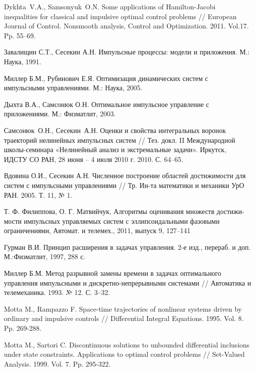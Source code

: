 \pagebreak
\begin{thebibliography}{99}

 { Dykhta~V.A., Samsonyuk~O.N.}  Some applications of
  Hamilton-Jacobi inequalities for classical and impulsive optimal
  control problems // European Journal of Control. Nonsmooth analysis,
  Control and Optimization. 2011. Vol.17. Pp. 55--69.

 { Завалищин С.Т., Сесекин А.Н.}  {Импульсные
    процессы: модели и приложения}.  М.: Наука, 1991.

 { Миллер Б.М., Рубинович Е.Я.}  { Оптимизация
    динамических систем с импульсными управлениями}.  М.: Наука, 2005.

 { Дыхта В.А., Самсонюк О.Н.}  Оптимальное импульсное
  управление с приложениями.  М.: Физматлит, 2003.

 { Самсонюк~О.Н., Сесекин~А.Н.} Оценки и свойства
  интегральных воронок траекторий нелинейных импульсных систем //
  Тез. докл. II Международной школы-семинара «Нелинейный анализ и
  экстремальные задачи». Иркутск, ИДСТУ СО РАН, 28 июня -- 4 июля 2010
  г. 2010. С. 64--65.

 Вдовина О.И., Сесекин А.Н. Численное построение
  областей достижимости для систем с импульсными управлениями //
  Тр. Ин-та математики и механики УрО РАН.  2005. Т. 11, № 1.

 Т. Ф. Филиппова, О. Г. Матвийчук, Алгоритмы
  оценивания множеств достижи- мости импульсных управляемых систем с
  эллипсоидальными фазовыми ограничениями, Автомат. и телемех.,
  2011, выпуск 9, 127–141

 Гурман В.И. Принцип расширения в задачах
  управления. 2-е изд., перераб. и доп. М.:Физматлит, 1997, 288 с.

 Миллер Б.М. Метод разрывной замены времени в задачах
  оптимального управления импульсными и дискретно-непрерывными
  системами // Автоматика и телемеханика. 1993. № 12. С. 3--32.

 Motta M., Rampazzo F. Space-time trajectories of
  nonlinear systems driven by ordinary and impulsive controls //
  Differential Integral Equations. 1995. Vol. 8.  Pp. 269-288.

 Motta M., Sartori C. Discontinuous solutions to
  unbounded differential inclusions under state constraints.
  Applications to optimal control problems // Set-Valued
  Analysis. 1999. Vol. 7. Pp. 295-322.


\end{thebibliography}
